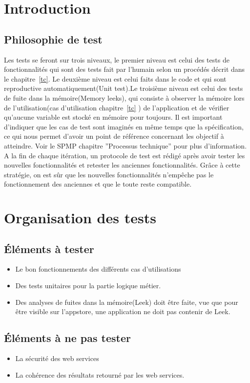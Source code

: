 \section{Introduction}


	\subsection{Philosophie de test}
	Les tests se feront sur trois niveaux, le premier niveau est celui des tests de fonctionnalités qui sont des tests fait par l'humain selon un procédés décrit dans le chapitre~\ref{tc}.  Le deuxième niveau est celui faits dans le code et qui sont reproductive automatiquement(Unit test).Le troisième niveau est celui des tests de fuite dans la mémoire(Memory leeks), qui consiste à observer la mémoire lors de l'utilisation(cas d'utilisation chapitre~\ref{tc} ) de l'application et de vérifier qu'aucune variable est stocké en mémoire pour toujours.  Il est important d'indiquer que les cas de test sont imaginés en même temps que la spécification, ce qui nous permet d'avoir un point de référence concernant les objectif à atteindre. Voir le \gls{SPMP} chapitre ''Processus technique'' pour plus d'information.\\
	 A la fin de chaque itération, un protocole de test est rédigé après avoir tester les nouvelles fonctionnalités et retester les anciennes fonctionnalités. Grâce à cette stratégie, on est sûr que les nouvelles fonctionnalités n'empêche pas le fonctionnement des anciennes et que le toute reste compatible.
\section{Organisation des tests }
	\subsection{Éléments à tester}
		\begin{itemize}
			\item Le bon fonctionnements des différents cas d'utilisations
			\item Des tests unitaires pour la partie logique métier.
			\item Des analyses de fuites dans la mémoire(Leek) doit être faite, vue que pour être visible sur l'appstore, une application ne doit pas contenir de Leek.
		\end{itemize}
	\subsection{Éléments à ne pas tester}
		\begin{itemize}
			\item La sécurité des web services
			\item La cohérence des résultats retourné par les web services.
		\end{itemize}
